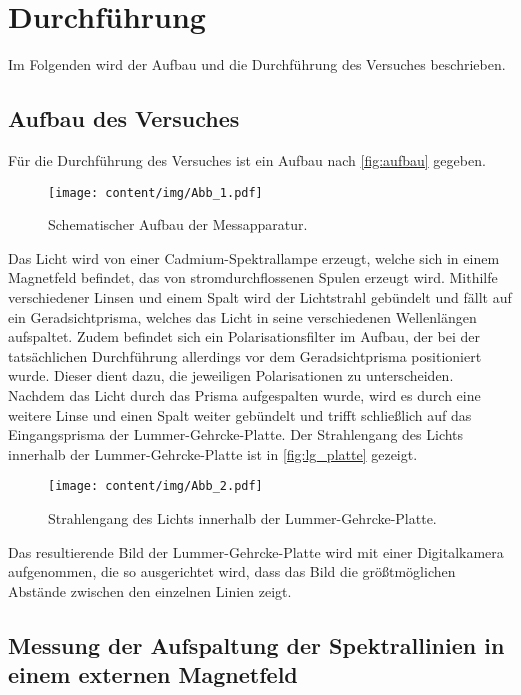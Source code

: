 \section{Durchführung}
\label{sec:durchfuehrung}
Im Folgenden wird der Aufbau und die Durchführung des Versuches beschrieben.

\subsection{Aufbau des Versuches}

Für die Durchführung des Versuches ist ein Aufbau nach \autoref{fig:aufbau} gegeben.
\begin{figure}[H]
    \centering
    \texttt{[image: content/img/Abb\_1.pdf]}
    \caption{Schematischer Aufbau der Messapparatur. \cite{versuchsanleitung}}
    \label{fig:aufbau}
\end{figure}

Das Licht wird von einer Cadmium-Spektrallampe erzeugt,
welche sich in einem Magnetfeld befindet,
das von stromdurchflossenen Spulen erzeugt wird.
Mithilfe verschiedener Linsen und einem Spalt wird der Lichtstrahl gebündelt und fällt auf ein Geradsichtprisma,
welches das Licht in seine verschiedenen Wellenlängen aufspaltet.
Zudem befindet sich ein Polarisationsfilter im Aufbau,
der bei der tatsächlichen Durchführung allerdings vor dem Geradsichtprisma positioniert wurde.
Dieser dient dazu,
die jeweiligen Polarisationen zu unterscheiden.
Nachdem das Licht durch das Prisma aufgespalten wurde,
wird es durch eine weitere Linse und einen Spalt weiter gebündelt und trifft schließlich auf das Eingangsprisma der Lummer-Gehrcke-Platte.
Der Strahlengang des Lichts innerhalb der Lummer-Gehrcke-Platte ist in \autoref{fig:lg_platte} gezeigt.
\begin{figure}[H]
    \centering
    \texttt{[image: content/img/Abb\_2.pdf]}
    \caption{Strahlengang des Lichts innerhalb der Lummer-Gehrcke-Platte. \cite{versuchsanleitung}}
    \label{fig:lg_platte}
\end{figure}
Das resultierende Bild der Lummer-Gehrcke-Platte wird mit einer Digitalkamera aufgenommen,
die so ausgerichtet wird, 
dass das Bild die größtmöglichen Abstände zwischen den einzelnen Linien zeigt.

\subsection{Messung der Aufspaltung der Spektrallinien in einem externen Magnetfeld}

